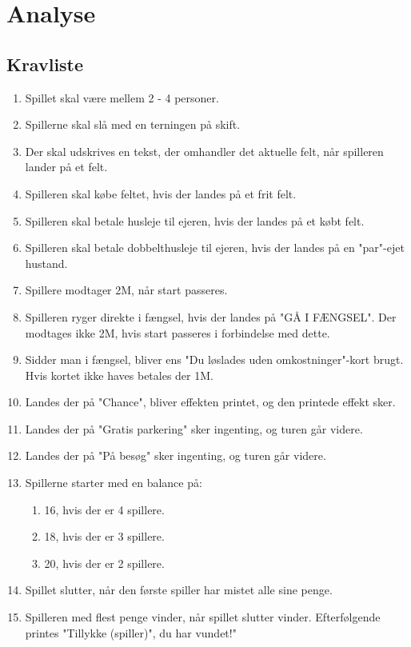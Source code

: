 \section{Analyse}
        
    
    \subsection{Kravliste}
        \begin{enumerate}
            \item Spillet skal være mellem 2 - 4 personer.
            \item Spillerne skal slå med en terningen på skift.
            \item Der skal udskrives en tekst, der omhandler det aktuelle felt, når spilleren lander på et felt.
            \item Spilleren skal købe feltet, hvis der landes på et frit felt.
            \item Spilleren skal betale husleje til ejeren, hvis der landes på et købt felt.
            \item Spilleren skal betale dobbelthusleje til ejeren, hvis der landes på en "par"-ejet hustand.
            \item Spillere modtager 2M, når start passeres.
            \item Spilleren ryger direkte i fængsel, hvis der landes på "GÅ I FÆNGSEL". Der modtages ikke 2M, hvis start passeres i forbindelse med dette.
            \item Sidder man i fængsel, bliver ens "Du løslades uden omkostninger"-kort brugt. Hvis kortet ikke haves betales der 1M.
            \item Landes der på "Chance", bliver effekten printet, og den printede effekt sker.
            \item Landes der på "Gratis parkering" sker ingenting, og turen går videre.
            \item Landes der på "På besøg" sker ingenting, og turen går videre.

            \item Spillerne starter med en balance på:
            \begin{enumerate}
                \item 16, hvis der er 4 spillere.
                \item 18, hvis der er 3 spillere.
                \item 20, hvis der er 2 spillere.
            \end{enumerate}
            \item Spillet slutter, når den første spiller har mistet alle sine penge.
            \item Spilleren med flest penge vinder, når spillet slutter vinder. Efterfølgende printes "Tillykke (spiller)", du har vundet!"


\end{enumerate}
